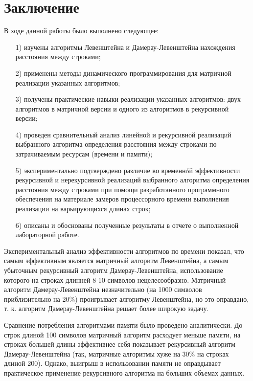 \documentclass[a4paper,12pt]{article}
\begin{document}
    

\pagebreak
\section*{Заключение}

	В ходе данной работы было выполнено следующее:
	
\begin{enumerate} 
	\item[1)] изучены алгоритмы Левенштейна и Дамерау-Левенштейна нахождения 
	расстояния между
	строками;
	\item[2)] применены методы динамического программирования для матричной 
	реализации указанных
	алгоритмов;
	\item[3)] получены практические навыки реализации указанных алгоритмов: двух
	алгоритмов в
	матричной версии и одного из алгоритмов в рекурсивной версии;
	\item[4)] проведен сравнительный анализ линейной и рекурсивной реализаций выбранного
	алгоритма
	определения расстояния между строками по затрачиваемым ресурсам (времени и
	памяти);
	\item[5)] экспериментально подтверждено различие во временнóй эффективности
	рекурсивной и
	нерекурсивной реализаций выбранного алгоритма определения расстояния между
	строками при
	помощи разработанного программного обеспечения на материале замеров
	процессорного времени
	выполнения реализации на варьирующихся длинах строк;
	\item[6)] описаны и обоснованы полученные результаты в отчете о выполненной
	лабораторной
	работе. 
\end{enumerate} 
	
	Экспериментальный анализ эффективности алгоритмов по времени показал, что самым эффективным является матричный алгоритм Левенштейна, а самым убыточным рекурсивный алгоритм Дамерау-Левенштейна, использование которого на строках длинней 8-10 символов нецелесообразно. Матричный алгоритм Дамерау-Левенштейна незначительно (на 1000 символов приблизительно на 20\%) проигрывает алгоритму Левенштейна, но это оправдано, т. к. алгоритм Дамерау-Левенштейна решает более широкую задачу. 
	
	Сравнение потребления алгоритмами памяти было проведено аналитически. До строк длиной 100 символов матричный алгоритм расходует меньше памяти, на строках большей длины эффективнее себя показывает рекурсивный алгоритм Дамерау-Левенштейна (так, матричные алгоритмы хуже на 30\% на строках длиной 200). Однако, выигрыш в использовании памяти не оправдывает практическое применение рекурсивного алгоритма на больших объемах данных. 
\end{document}
